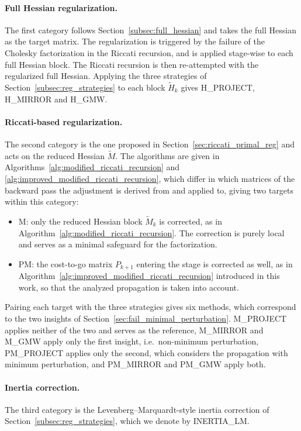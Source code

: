 \documentclass[class=scrbook, crop=false]{standalone}
\begin{document}
\paragraph{Full Hessian regularization.}
The first category follows Section~\ref{subsec:full_hessian} and takes the full Hessian as the target matrix.
The regularization is triggered by the failure of the Cholesky factorization in the Riccati recursion, 
and is applied stage-wise to each full Hessian block.
The Riccati recursion is then re-attempted with the regularized full Hessian.
Applying the three strategies of Section~\ref{subsec:reg_strategies} to each block $\tilde{H}_k$
gives \textsf{H\_PROJECT}, \textsf{H\_MIRROR} and \textsf{H\_GMW}.

\paragraph{Riccati-based regularization.}
The second category is the one proposed in Section~\ref{sec:riccati_primal_reg} and acts on the reduced Hessian $\tilde{M}$.
The algorithms are given in Algorithms~\ref{alg:modified_riccati_recursion} and \ref{alg:improved_modified_riccati_recursion},
which differ in which matrices of the backward pass the adjustment is derived from and applied to, 
giving two targets within this category:
\begin{itemize}
  \item \textsf{M}: only the reduced Hessian block $\tilde{M}_k$ is corrected, as in Algorithm~\ref{alg:modified_riccati_recursion}. 
  The correction is purely local and serves as a minimal safeguard for the factorization.
  \item \textsf{PM}: the cost-to-go matrix $P_{k+1}$ entering the stage is corrected as well, 
  as in Algorithm~\ref{alg:improved_modified_riccati_recursion} introduced in this work, 
  so that the analyzed propagation is taken into account.
\end{itemize}

Pairing each target with the three strategies gives six methods,
which correspond to the two insights of Section~\ref{sec:fail_minimal_perturbation}.
\textsf{M\_PROJECT} applies neither of the two and serves as the reference, 
\textsf{M\_MIRROR} and \textsf{M\_GMW} apply only the first insight, i.e.\ non-minimum perturbation,
\textsf{PM\_PROJECT} applies only the second, which considers the propagation with minimum perturbation,
and \textsf{PM\_MIRROR} and \textsf{PM\_GMW} apply both.

\paragraph{Inertia correction.}
The third category is the Levenberg--Marquardt-style inertia correction of Section~\ref{subsec:reg_strategies},
which we denote by \textsf{INERTIA\_LM}.
\end{document}
